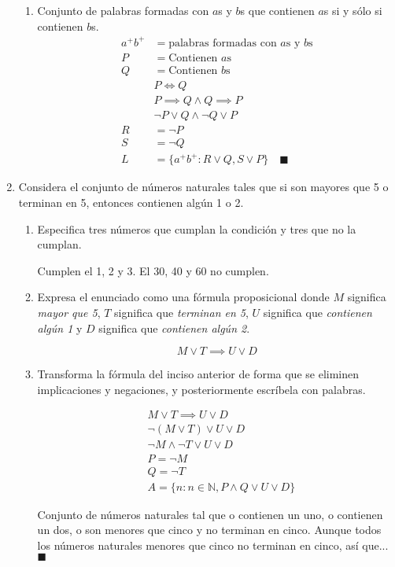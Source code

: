 \documentclass[]{book}
\theoremstyle{definition}
\begin{document}
\begin{enumerate}
\begin{enumerate}
        \item Conjunto de palabras formadas con $a$s y $b$s que contienen $a$s si y sólo si contienen $b$s.
        \begin{align*}
            a^+ b^+ & = \text{palabras formadas con } a \text{s y } b \text{s}\\
            P & = \text{Contienen } a \text{s}\\
            Q & = \text{Contienen } b \text{s}\\[2ex]
            & P \iff Q\\
            & P \implies Q \wedge Q \implies P\\
            & \neg P \vee Q \wedge \neg Q \vee P\\[2ex]
            R & = \neg P\\
            S & = \neg Q\\[2ex]
            L & = \{a^+ b^+ : R \vee Q, S \vee P\} \quad \blacksquare
        \end{align*}
	\end{enumerate}
	\item Considera el conjunto de números naturales tales que si son mayores que 5 o terminan en 5, entonces contienen algún 1 o 2.
	\begin{enumerate}
        \item Especifica tres números que cumplan la condición y tres que no la cumplan.
        
        Cumplen el 1, 2 y 3. El 30, 40 y 60 no cumplen.

        \item Expresa el enunciado como una fórmula proposicional donde $M$ significa \textit{mayor que 5}, $T$ significa que \textit{terminan en 5}, $U$ significa que \textit{contienen algún 1} y $D$ significa que \textit{contienen algún 2}.

        \[ M \vee T \implies U \vee D\]

        \item Transforma la fórmula del inciso anterior de forma que se eliminen implicaciones y negaciones, y posteriormente escríbela con palabras.

        \begin{align*}
            & M \vee T \implies U \vee D\\
            & \neg (M \vee T) \vee U \vee D\\
            & \neg M \wedge \neg T \vee U \vee D\\[2ex]
            & P = \neg M\\
            & Q = \neg T\\[2ex]
            & A = \{n : n \in \mathbb{N}, P \wedge Q \vee U \vee D\}
        \end{align*}

        Conjunto de números naturales tal que o contienen un uno, o contienen un dos, o son menores que cinco y no terminan en cinco. {\tiny Aunque todos los números naturales menores que cinco no terminan en cinco, así que...} $\blacksquare$
	\end{enumerate}
	\end{enumerate}
\end{document}
